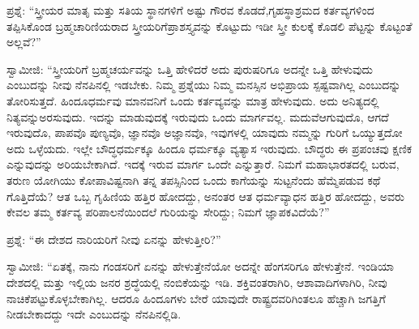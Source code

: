 \vskip 5pt

ಪ್ರಶ್ನೆ: “ಸ್ತ್ರೀಯರ ಮಾತೃ ಮತ್ತು ಸತಿಯ ಸ್ಥಾನಗಳಿಗೆ ಅಷ್ಟು ಗೌರವ ಕೊಡದೆ,\break ಗೃಹಸ್ಥಾಶ್ರಮದ ಕರ್ತವ್ಯಗಳಿಂದ ತಪ್ಪಿಸಿಕೊಂಡ ಬ್ರಹ್ಮಚಾರಿಣಿಯರಾದ ಸ್ತ್ರೀಯರಿಗೆ\break ಪ್ರಾಶಸ್ತ್ಯವನ್ನು ಕೊಟ್ಟುದು ಇಡೀ ಸ್ತ್ರೀ ಕುಲಕ್ಕೆ ಕೊಡಲಿ ಪೆಟ್ಟನ್ನು ಕೊಟ್ಟಂತೆ ಅಲ್ಲವೆ?”

\vskip 5pt

ಸ್ವಾಮೀಜಿ: “ಸ್ತ್ರೀಯರಿಗೆ ಬ್ರಹ್ಮಚರ್ಯವನ್ನು ಒತ್ತಿ ಹೇಳಿದರೆ ಅದು ಪುರುಷರಿಗೂ ಅದನ್ನೇ ಒತ್ತಿ ಹೇಳುವುದು ಎಂಬುದನ್ನು ನೀವು ನೆನಪಿನಲ್ಲಿ ಇಡಬೇಕು. ನಿಮ್ಮ ಪ್ರಶ್ನೆಯು ನಿಮ್ಮ ಮನಸ್ಸಿನ ಅಭಿಪ್ರಾಯ ಸ್ಪಷ್ಟವಾಗಿಲ್ಲ ಎಂಬುದನ್ನು ತೋರಿಸುತ್ತದೆ. ಹಿಂದೂಧರ್ಮವು ಮಾನವನಿಗೆ ಒಂದು ಕರ್ತವ್ಯವನ್ನು ಮಾತ್ರ ಹೇಳುವುದು. ಅದು ಅನಿತ್ಯದಲ್ಲಿ ನಿತ್ಯವನ್ನು\break ಅರಸುವುದು. ಇದನ್ನು ಮಾಡುವುದಕ್ಕೆ ಇರುವುದು ಒಂದು ಮಾರ್ಗವಲ್ಲ. ಮದುವೆ\break ಆಗುವುದೊ, ಆಗದೆ ಇರುವುದೊ, ಪಾಪವೊ ಪುಣ್ಯವೊ, ಜ್ಞಾನವೊ ಅಜ್ಞಾನವೊ, ಇವುಗಳಲ್ಲಿ ಯಾವುದು ನಮ್ಮನ್ನು ಗುರಿಗೆ ಒಯ್ಯುತ್ತದೋ ಅದು ಒಳ್ಳೆಯದು. ಇಲ್ಲೇ ಬೌದ್ಧಧರ್ಮಕ್ಕೂ ಹಿಂದೂ ಧರ್ಮಕ್ಕೂ ವ್ಯತ್ಯಾಸ ಇರುವುದು. ಬೌದ್ಧರು ಈ ಪ್ರಪಂಚವು ಕ್ಷಣಿಕ ಎನ್ನುವುದನ್ನು ಅರಿಯಬೇಕಾಗಿದೆ. ಇದಕ್ಕೆ ಇರುವ ಮಾರ್ಗ ಒಂದೇ ಎನ್ನುತ್ತಾರೆ. ನಿಮಗೆ ಮಹಾಭಾರತದಲ್ಲಿ ಬರುವ, ತರುಣ ಯೋಗಿಯು ಕೋಪಾವಿಷ್ಟನಾಗಿ ತನ್ನ ತಪಸ್ಸಿನಿಂದ ಒಂದು ಕಾಗೆಯನ್ನು ಸುಟ್ಟನೆಂದು ಹೆಮ್ಮೆಪಡುವ ಕಥೆ ಗೊತ್ತಿದೆಯೆ? ಆತ ಒಬ್ಬ ಗೃಹಿಣಿಯ ಹತ್ತಿರ ಹೋದದ್ದು, ಅನಂತರ ಆತ ಧರ್ಮವ್ಯಾಧನ ಹತ್ತಿರ ಹೋದದ್ದು, ಅವರು ಕೇವಲ ತಮ್ಮ ಕರ್ತವ್ಯ ಪರಿಪಾಲನೆಯಿಂದಲೆ ಗುರಿಯನ್ನು ಸೇರಿದ್ದು; ನಿಮಗೆ ಜ್ಞಾಪಕವಿದೆಯೆ?”

\vskip 5pt

ಪ್ರಶ್ನೆ: “ಈ ದೇಶದ ನಾರಿಯರಿಗೆ ನೀವು ಏನನ್ನು ಹೇಳುತ್ತೀರಿ?”

\vskip 5pt

ಸ್ವಾಮೀಜಿ: “ಏತಕ್ಕೆ, ನಾನು ಗಂಡಸರಿಗೆ ಏನನ್ನು ಹೇಳುತ್ತೇನೆಯೋ ಅದನ್ನೇ ಹೆಂಗಸರಿಗೂ ಹೇಳುತ್ತೇನೆ. ಇಂಡಿಯಾ ದೇಶದಲ್ಲಿ ಮತ್ತು ಇಲ್ಲಿಯ ಜನರ ಶ್ರದ್ಧೆಯಲ್ಲಿ ನಂಬಿಕೆಯನ್ನು ಇಡಿ. ಶಕ್ತಿವಂತರಾಗಿರಿ, ಆಶಾವಾದಿಗಳಾಗಿರಿ, ನೀವು ನಾಚಿಕೆಪಟ್ಟುಕೊಳ್ಳಬೇಕಾಗಿಲ್ಲ. ಆದರೂ ಹಿಂದೂಗಳು ಬೇರೆ ಯಾವುದೇ ರಾಷ್ಟ್ರದವರಿಗಿಂತಲೂ ಹೆಚ್ಚಾಗಿ ಜಗತ್ತಿಗೆ ನೀಡಬೇಕಾದದ್ದು ಇದೇ ಎಂಬುದನ್ನು ನೆನಪಿನಲ್ಲಿಡಿ.

